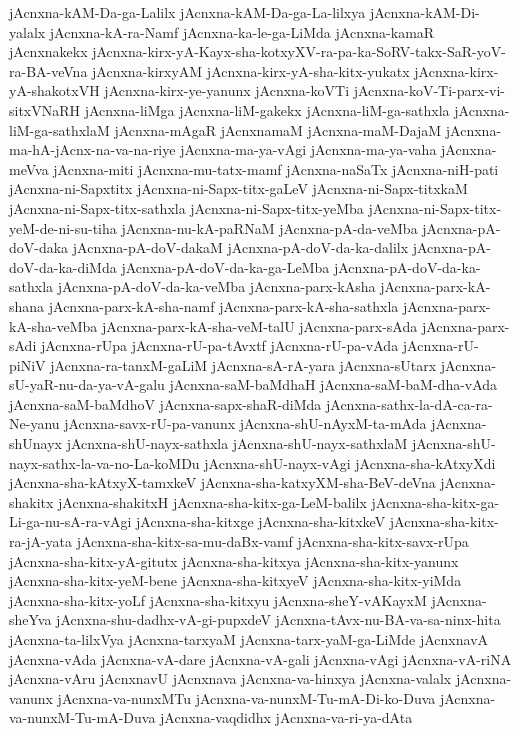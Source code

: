 {jAcnxna-kAM-Da-ga-Lalilx
jAcnxna-kAM-Da-ga-La-lilxya
jAcnxna-kAM-Di-yalalx
jAcnxna-kA-ra-Namf
jAcnxna-ka-le-ga-LiMda
jAcnxna-kamaR
jAcnxnakekx
jAcnxna-kirx-yA-Kayx-sha-kotxyXV-ra-pa-ka-SoRV-takx-SaR-yoV-ra-BA-veVna
jAcnxna-kirxyAM
jAcnxna-kirx-yA-sha-kitx-yukatx
jAcnxna-kirx-yA-shakotxVH
jAcnxna-kirx-ye-yanunx
jAcnxna-koVTi
jAcnxna-koV-Ti-parx-vi-sitxVNaRH
jAcnxna-liMga
jAcnxna-liM-gakekx
jAcnxna-liM-ga-sathxla
jAcnxna-liM-ga-sathxlaM
jAcnxna-mAgaR
jAcnxnamaM
jAcnxna-maM-DajaM
jAcnxna-ma-hA-jAcnx-na-va-na-riye
jAcnxna-ma-ya-vAgi
jAcnxna-ma-ya-vaha
jAcnxna-meVva
jAcnxna-miti
jAcnxna-mu-tatx-mamf
jAcnxna-naSaTx
jAcnxna-niH-pati
jAcnxna-ni-Sapxtitx
jAcnxna-ni-Sapx-titx-gaLeV
jAcnxna-ni-Sapx-titxkaM
jAcnxna-ni-Sapx-titx-sathxla
jAcnxna-ni-Sapx-titx-yeMba
jAcnxna-ni-Sapx-titx-yeM-de-ni-su-tiha
jAcnxna-nu-kA-paRNaM
jAcnxna-pA-da-veMba
jAcnxna-pA-doV-daka
jAcnxna-pA-doV-dakaM
jAcnxna-pA-doV-da-ka-dalilx
jAcnxna-pA-doV-da-ka-diMda
jAcnxna-pA-doV-da-ka-ga-LeMba
jAcnxna-pA-doV-da-ka-sathxla
jAcnxna-pA-doV-da-ka-veMba
jAcnxna-parx-kAsha
jAcnxna-parx-kA-shana
jAcnxna-parx-kA-sha-namf
jAcnxna-parx-kA-sha-sathxla
jAcnxna-parx-kA-sha-veMba
jAcnxna-parx-kA-sha-veM-talU
jAcnxna-parx-sAda
jAcnxna-parx-sAdi
jAcnxna-rUpa
jAcnxna-rU-pa-tAvxtf
jAcnxna-rU-pa-vAda
jAcnxna-rU-piNiV
jAcnxna-ra-tanxM-gaLiM
jAcnxna-sA-rA-yara
jAcnxna-sUtarx
jAcnxna-sU-yaR-nu-da-ya-vA-galu
jAcnxna-saM-baMdhaH
jAcnxna-saM-baM-dha-vAda
jAcnxna-saM-baMdhoV
jAcnxna-sapx-shaR-diMda
jAcnxna-sathx-la-dA-ca-ra-Ne-yanu
jAcnxna-savx-rU-pa-vanunx
jAcnxna-shU-nAyxM-ta-mAda
jAcnxna-shUnayx
jAcnxna-shU-nayx-sathxla
jAcnxna-shU-nayx-sathxlaM
jAcnxna-shU-nayx-sathx-la-va-no-La-koMDu
jAcnxna-shU-nayx-vAgi
jAcnxna-sha-kAtxyXdi
jAcnxna-sha-kAtxyX-tamxkeV
jAcnxna-sha-katxyXM-sha-BeV-deVna
jAcnxna-shakitx
jAcnxna-shakitxH
jAcnxna-sha-kitx-ga-LeM-balilx
jAcnxna-sha-kitx-ga-Li-ga-nu-sA-ra-vAgi
jAcnxna-sha-kitxge
jAcnxna-sha-kitxkeV
jAcnxna-sha-kitx-ra-jA-yata
jAcnxna-sha-kitx-sa-mu-daBx-vamf
jAcnxna-sha-kitx-savx-rUpa
jAcnxna-sha-kitx-yA-gitutx
jAcnxna-sha-kitxya
jAcnxna-sha-kitx-yanunx
jAcnxna-sha-kitx-yeM-bene
jAcnxna-sha-kitxyeV
jAcnxna-sha-kitx-yiMda
jAcnxna-sha-kitx-yoLf
jAcnxna-sha-kitxyu
jAcnxna-sheY-vAKayxM
jAcnxna-sheYva
jAcnxna-shu-dadhx-vA-gi-pupxdeV
jAcnxna-tAvx-nu-BA-va-sa-ninx-hita
jAcnxna-ta-lilxVya
jAcnxna-tarxyaM
jAcnxna-tarx-yaM-ga-LiMde
jAcnxnavA
jAcnxna-vAda
jAcnxna-vA-dare
jAcnxna-vA-gali
jAcnxna-vAgi
jAcnxna-vA-riNA
jAcnxna-vAru
jAcnxnavU
jAcnxnava
jAcnxna-va-hinxya
jAcnxna-valalx
jAcnxna-vanunx
jAcnxna-va-nunxMTu
jAcnxna-va-nunxM-Tu-mA-Di-ko-Duva
jAcnxna-va-nunxM-Tu-mA-Duva
jAcnxna-vaqdidhx
jAcnxna-va-ri-ya-dAta
}
